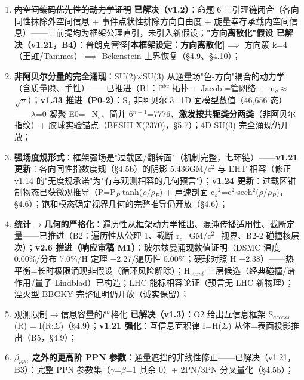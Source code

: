 \documentclass[12pt]{article}
\newcommand{\mtag}[1]{\textbf{[#1]}}
\newcommand{\up}[1]{\ensuremath{^{#1}}}
\newcommand{\down}[1]{\ensuremath{_{#1}}}
\begin{document}
\begin{enumerate}
\item \sout{内空间编码优先性的动力学证明} \textbf{\checkmark 已解决（v1.2）}：命题 6 三引理链闭合（各向同性抹除外空间信息 + 事件点状性排除方向自由度 + 旋量幸存承载内空间信息）------三前提均为框架公理直引，未引入新假设；\textbf{"方向离散化"假设 \checkmark 已解决（v1.21，B4）}：普朗克管径\mtag{本框架设定：方向离散化}\ensuremath{\implies} 方向簇 k=4（王虹/Tammes）\ensuremath{\implies} Bekenstein 上界恢复（\S{}4.9、\S{}4.10）；
\item \textbf{非阿贝尔分量的完全涌现}：SU(2)\ensuremath{\times}SU(3) 从通量场"色-方向"耦合的动力学（含质量隙、手性）------\checkmark 已推进（B1：f\up{abc} 拓扑 + Jacobi=管网络 + m\down{g}\ensuremath{\approx}\ensuremath{\sqrt{\sigma{}}}）；\textbf{v1.33 推进（P0-2）}：S\down{3} 非阿贝尔 3+1D 面模型数值（46,656 态）------\ensuremath{\lambda}=0 凝聚 E0=\ensuremath{-}N\down{c}、简并 6\up{n-1}=7776、\textbf{激发按共轭类分两类}（非阿贝尔指纹）+ 胶球实验锚点（BESIII X(2370)，\S{}5.7）；4D SU(3) 完全涌现仍开放；
\item \textbf{强场度规形式}：框架强场是"过载区/翻转面"（机制完整，七环链）------\textbf{v1.21 更新}：各向同性指数度规（\S{}4.5b）的阴影 5.436GM/c\up{2} 与 EHT 相容（修正 v1.14 的"无度规承诺"为"有与观测相容的几何预言"）；\textbf{v1.24 更新}：过载区钳制物态已获微观推导（P=P\down{P}\ensuremath{\cdot}tanh(\ensuremath{\rho}/\ensuremath{\rho}\down{P}) + 声速剖面 c\down{s}\up{2}=c\up{2}\ensuremath{\cdot}sech\up{2}(\ensuremath{\rho}/\ensuremath{\rho}\down{P})，\S{}4.6）；饱和模态确定视界几何的完整推导仍开放（\S{}4.6）；
\item \textbf{统计\ensuremath{\to}几何的严格化}：遍历性从框架动力学推出、混沌传播适用性、截断定量------\checkmark 已推进（B2：遍历性从公理 1、截断 r\down{c}=GM/c\up{2}=视界、B2-2 碰撞核层次）；\textbf{v2.6 推进（响应审稿 M1）}：玻尔兹曼涌现数值证明（DSMC 温度 0.00\%/分布 7.0\%/H 定理 \ensuremath{-}2.27/遍历性 0.00\%；硬球对照 H \ensuremath{-}2.38）------热平衡=长时极限涌现非假设（循环风险解除）；H\down{event} 三层候选（经典碰撞/谱作用/量子 Lindblad）已构造；LHC 能标相容论证（预言无 LHC 新物理）；湮灭型 BBGKY 完整证明仍开放（诚实保留）；
\item \sout{观测限制\ensuremath{\to}信息容量的严格化} \textbf{\checkmark 已解决（v1.3）}：O2 给出互信息框架 S\down{access}(R) = I(R;\ensuremath{\Sigma})（\S{}4.9）；\textbf{v1.21 强化}：互信息面积律 I=H(\ensuremath{\Sigma}) 从体=表面投影推出（B5，\S{}4.9）；
\item \textbf{\ensuremath{\beta}\down{ppn} 之外的更高阶 PPN 参数}：通量遮挡的非线性修正------\checkmark 已解决（v1.21，B3）：完整 PPN 参数集（\ensuremath{\gamma}=\ensuremath{\beta}=1 其余 0）+ 2PN/3PN 分叉量化（\S{}4.5b）；

\end{enumerate}
\end{document}
